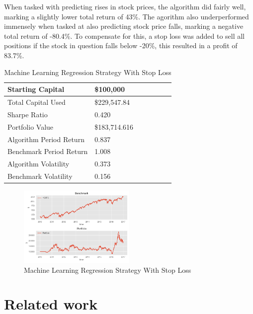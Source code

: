 \documentclass[times]{jtitauth}
\begin{document}
When tasked with predicting rises in stock prices, the algorithm did fairly well, marking a slightly lower total return of 43\%. The agorithm also underperformed immensely when tasked at also predicting stock price falls, marking a negative total return of -80.4\%. To compensate for this, a stop loss was added to sell all positions if the stock in question falls below -20\%, this resulted in a profit of 83.7\%.

\begin{table}[!hbp]
    \centering
        \begin{tabular}{ | l | l | l | | l | l | l | p{5cm} |}
        \hline
        Starting Capital & \$100,000 \\ \hline
        Total Capital Used & \$229,547.84 \\ \hline
        Sharpe Ratio & 0.420 \\ \hline
        Portfolio Value & \$183,714.616 \\ \hline
        Algorithm Period Return & 0.837 \\ \hline
        Benchmark Period Return & 1.008 \\ \hline
        Algorithm Volatility & 0.373 \\ \hline
        Benchmark Volatility & 0.156 \\
        \hline
        \end{tabular}
    \caption{Machine Learning Regression Strategy With Stop Loss}
\end{table}

\begin{figure}[!hbp]
\includegraphics[width=0.5\textwidth]{MLR-Portfolio-Benchmark-Stop-Loss.png}
\caption{Machine Learning Regression Strategy With Stop Loss}
\end{figure}

\section{Related work}
\end{document}
